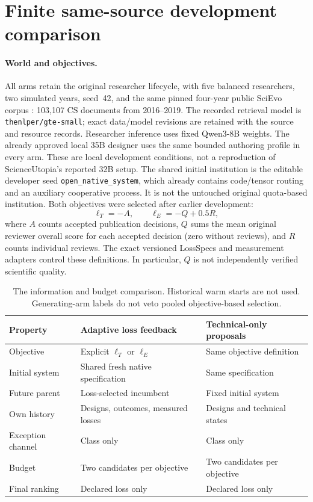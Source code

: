 \documentclass{article}
\begin{document}
\section{Finite same-source development comparison}
\label{sec:experiment}
\paragraph{World and objectives.}
All arms retain the original researcher lifecycle, with five balanced
researchers, two simulated years, seed~42, and the same pinned four-year public
SciEvo corpus \citep{jin2024scievo}: 103,107 CS documents from 2016--2019.
The recorded retrieval model is \texttt{thenlper/gte-small}; exact data/model
revisions are retained with the source and resource records.
Researcher inference uses fixed Qwen3-8B weights. The already approved
local 35B designer uses the same bounded authoring profile in every arm. These
are local development conditions, not a reproduction of ScienceUtopia's
reported 32B setup. The shared initial institution is the editable developer
seed \texttt{open\_native\_system}, which already contains code/tensor routing
and an auxiliary cooperative process. It is not the untouched original
quota-based institution. Both objectives were selected after earlier development:
\begin{equation}
  \ell_T=-A,\qquad \ell_E=-Q+0.5R,
\end{equation}
where $A$ counts accepted publication decisions, $Q$ sums the mean original
reviewer overall score for each accepted decision (zero without reviews), and
$R$ counts individual reviews. The exact
versioned LossSpecs and measurement adapters control these definitions. In
particular, $Q$ is not independently verified scientific quality.

\begin{table}[t]
\centering\small
\begin{tabular}{@{}p{.21\linewidth}p{.35\linewidth}p{.35\linewidth}@{}}
\toprule
Property & Adaptive loss feedback & Technical-only proposals\\
\midrule
Objective & Explicit $\ell_T$ or $\ell_E$ & Same objective definition\\
Initial system & Shared fresh native specification & Same specification\\
Future parent & Loss-selected incumbent & Fixed initial system\\
Own history & Designs, outcomes, measured losses & Designs and technical states\\
Exception channel & Class only & Class only\\
Budget & Two candidates per objective & Two candidates per objective\\
Final ranking & Declared loss only & Declared loss only\\
\bottomrule
\end{tabular}
\caption{The information and budget comparison. Historical warm starts are not
used. Generating-arm labels do not veto pooled objective-based selection.}
\label{tab:contract}
\end{table}
\end{document}
